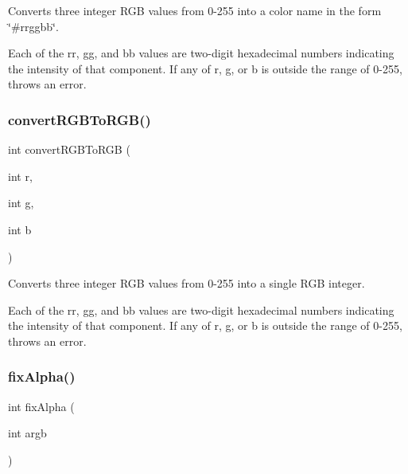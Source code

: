 Converts three integer R\+GB values from 0-\/255 into a color name in the form {\ttfamily \char`\"{}\#rrggbb\char`\"{}}. 

Each of the {\ttfamily rr}, {\ttfamily gg}, and {\ttfamily bb} values are two-\/digit hexadecimal numbers indicating the intensity of that component. If any of r, g, or b is outside the range of 0-\/255, throws an error. \mbox{\label{classsgl_1_1GColor_a7c4acb134cfa913f8a127b300a4b10a0}} 
\subsubsection{\texorpdfstring{convert\+R\+G\+B\+To\+R\+G\+B()}{convertRGBToRGB()}}
{\footnotesize\ttfamily int convert\+R\+G\+B\+To\+R\+GB (\begin{DoxyParamCaption}\item[{int}]{r,  }\item[{int}]{g,  }\item[{int}]{b }\end{DoxyParamCaption})\hspace{0.3cm}{\ttfamily [static]}}



Converts three integer R\+GB values from 0-\/255 into a single R\+GB integer. 

Each of the {\ttfamily rr}, {\ttfamily gg}, and {\ttfamily bb} values are two-\/digit hexadecimal numbers indicating the intensity of that component. If any of r, g, or b is outside the range of 0-\/255, throws an error. \mbox{\label{classsgl_1_1GColor_a0dd42e0c5898738e5edb542e06b7496c}} 
\subsubsection{\texorpdfstring{fix\+Alpha()}{fixAlpha()}}
{\footnotesize\ttfamily int fix\+Alpha (\begin{DoxyParamCaption}\item[{int}]{argb }\end{DoxyParamCaption})\hspace{0.3cm}{\ttfamily [static]}}



